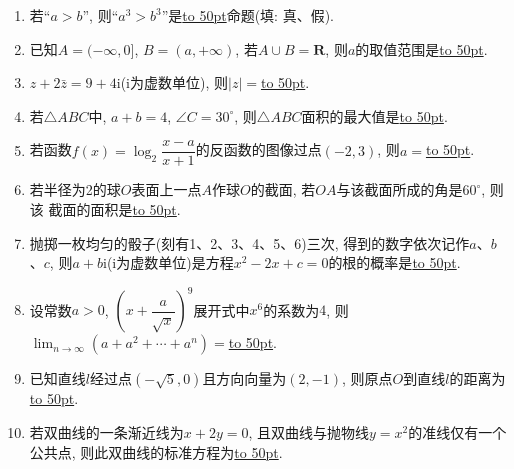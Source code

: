 \documentclass[10pt,a4paper]{article}
\newcommand{\blank}[1]{\underline{\hbox to #1pt{}}}
\begin{document}
\begin{enumerate}[1.]


\item  若``$a>b$'', 则``$a^3>b^3$''是\blank{50}命题(填: 真、假).
\item  已知$A=(-\infty ,0]$, $B=(a,+\infty )$, 若$A\cup B=\mathbf{R}$, 则$a$的取值范围是\blank{50}.
\item  $z+2\bar{z}=9+4\mathrm{i}$($\mathrm{i}$为虚数单位), 则$|z|=$\blank{50}.
\item  若$\triangle ABC$中, $a+b=4$, $\angle C=30^\circ$, 则$\triangle ABC$面积的最大值是\blank{50}.
\item  若函数$f(x)=\log_2\dfrac{x-a}{x+1}$的反函数的图像过点$(-2,3)$, 则$a=$\blank{50}.
\item  若半径为2的球$O$表面上一点$A$作球$O$的截面, 若$OA$与该截面所成的角是$60^\circ$, 则该
截面的面积是\blank{50}.
\item  抛掷一枚均匀的骰子(刻有1、2、3、4、5、6)三次, 得到的数字依次记作$a$、$b$、$c$, 则$a+b\mathrm{i}$($\mathrm{i}$为虚数单位)是方程$x^2-2x+c=0$的根的概率是\blank{50}.
\item  设常数$a>0$, $(x+\dfrac{a}{\sqrt{x}})^9$展开式中$x^6$的系数为$4$, 则$\displaystyle\lim_{n\to \infty}(a+a^2+\cdots+a^n)=$\blank{50}.
\item  已知直线$l$经过点$(-\sqrt{5},0)$且方向向量为$(2,-1)$, 则原点$O$到直线$l$的距离为\blank{50}.
\item  若双曲线的一条渐近线为$x+2y=0$, 且双曲线与抛物线$y=x^2$的准线仅有一个公共点, 则此双曲线的标准方程为\blank{50}.



\end{enumerate}
\end{document}
